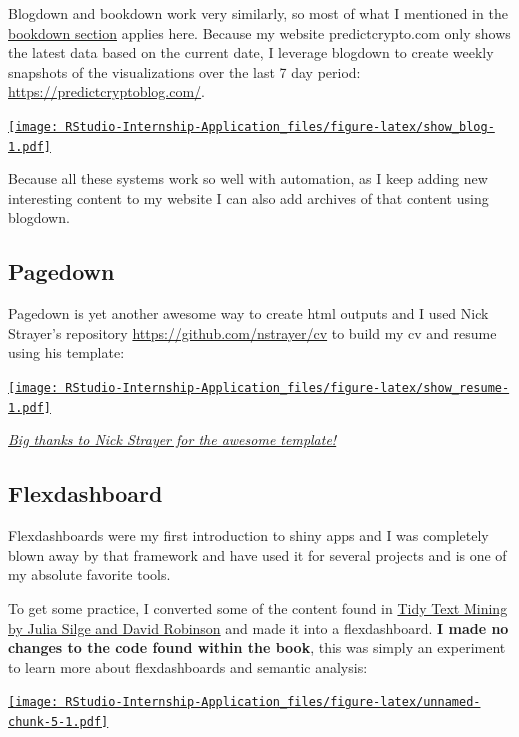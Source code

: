 \documentclass[
]{book}
\begin{document}
Blogdown\citep{R-blogdown} and bookdown work very similarly, so most of what I mentioned in the \protect\hyperlink{bookdown}{bookdown section} applies here. Because my website predictcrypto.com only shows the latest data based on the current date, I leverage blogdown to create weekly snapshots of the visualizations over the last 7 day period: \url{https://predictcryptoblog.com/}.

\href{https://predictcryptoblog.com/}{\texttt{[image: RStudio-Internship-Application\_files/figure-latex/show\_blog-1.pdf]}}

Because all these systems work so well with automation, as I keep adding new interesting content to my website I can also add archives of that content using blogdown.

\hypertarget{pagedown}{%
\subsection{Pagedown}\label{pagedown}}

Pagedown\citep{R-pagedown} is yet another awesome way to create html outputs and I used Nick Strayer's repository \url{https://github.com/nstrayer/cv} to build my cv and resume using his template:

\href{https://ricky-cv.netlify.com/resume}{\texttt{[image: RStudio-Internship-Application\_files/figure-latex/show\_resume-1.pdf]}}

\emph{\href{https://github.com/nstrayer/cv}{Big thanks to Nick Strayer for the awesome template!}}

\hypertarget{flexdashboard}{%
\subsection{Flexdashboard}\label{flexdashboard}}

Flexdashboards \citep{R-flexdashboard} were my first introduction to shiny apps and I was completely blown away by that framework and have used it for several projects and is one of my absolute favorite tools.

To get some practice, I converted some of the content found in \href{https://www.tidytextmining.com/}{Tidy Text Mining by Julia Silge and David Robinson} and made it into a flexdashboard. \textbf{I made no changes to the code found within the book}, this was simply an experiment to learn more about flexdashboards and semantic analysis:

\href{https://predictcrypto.shinyapps.io/SemanticAnalysisExample/}{\texttt{[image: RStudio-Internship-Application\_files/figure-latex/unnamed-chunk-5-1.pdf]}}
\end{document}
